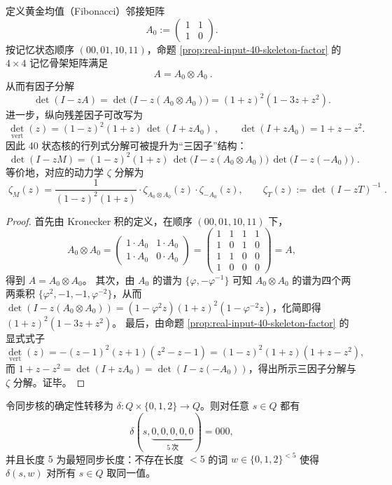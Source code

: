 \begin{proposition}\label{prop:real-input-40-A0-tensor-hidden}
定义黄金均值（Fibonacci）邻接矩阵
\[
A_0:=\begin{pmatrix}1&1\\[2pt]1&0\end{pmatrix}.
\]
按记忆状态顺序 \((00,01,10,11)\)，命题 \ref{prop:real-input-40-skeleton-factor} 的 \(4\times 4\) 记忆骨架矩阵满足
\[
\boxed{\ A=A_0\otimes A_0\ }.
\]
从而有因子分解
\[
\det(I-zA)=\det\!\bigl(I-z(A_0\otimes A_0)\bigr)
=(1+z)^2(1-3z+z^2).
\]
进一步，纵向残差因子可改写为
\[
\boxed{\ \det_{\mathrm{vert}}(z)=(1-z)^2(1+z)\,\det(I+zA_0)\ },
\qquad
\det(I+zA_0)=1+z-z^2.
\]
因此 40 状态核的行列式分解可被提升为“三因子”结构：
\[
\boxed{\;
\det(I-zM)
=(1-z)^2(1+z)\,
\det\!\bigl(I-z(A_0\otimes A_0)\bigr)\,
\det\!\bigl(I-z(-A_0)\bigr)\; }.
\]
等价地，对应的动力学 \(\zeta\) 分解为
\[
\boxed{\;
\zeta_M(z)=\frac{1}{(1-z)^2(1+z)}\cdot
\zeta_{A_0\otimes A_0}(z)\cdot
\zeta_{-A_0}(z),\qquad
\zeta_T(z):=\det(I-zT)^{-1}\; }.
\]
\end{proposition}

\begin{proof}
首先由 Kronecker 积的定义，在顺序 \((00,01,10,11)\) 下，
\[
A_0\otimes A_0=
\begin{pmatrix}
1\cdot A_0 & 1\cdot A_0\\
1\cdot A_0 & 0\cdot A_0
\end{pmatrix}
=
\begin{pmatrix}
1&1&1&1\\
1&0&1&0\\
1&1&0&0\\
1&0&0&0
\end{pmatrix}=A,
\]
得到 \(A=A_0\otimes A_0\)。
其次，由 \(A_0\) 的谱为 \(\{\varphi,-\varphi^{-1}\}\) 可知 \(A_0\otimes A_0\) 的谱为四个两两乘积
\(\{\varphi^2,-1,-1,\varphi^{-2}\}\)，从而
\(\det(I-z(A_0\otimes A_0))=(1-\varphi^2 z)(1+\!z)^2(1-\varphi^{-2}z)\)，化简即得 \((1+z)^2(1-3z+z^2)\)。
最后，由命题 \ref{prop:real-input-40-skeleton-factor} 的显式式子
\[
\det_{\mathrm{vert}}(z)=-(z-1)^2(z+1)(z^2-z-1)
=(1-z)^2(1+z)(1+z-z^2),
\]
而 \(1+z-z^2=\det(I+zA_0)=\det(I-z(-A_0))\)，得出所示三因子分解与 \(\zeta\) 分解。证毕。
\end{proof}

\begin{proposition}\label{prop:real-input-40-reset-word}
令同步核的确定性转移为 $\delta:Q\times\{0,1,2\}\to Q$。则对任意 $s\in Q$ 都有
\[
\delta(s,\underbrace{0,0,0,0,0}_{5\ \text{次}})=000,
\]
并且长度 $5$ 为最短同步长度：不存在长度 $<5$ 的词 $w\in\{0,1,2\}^{<5}$ 使得 $\delta(s,w)$ 对所有 $s\in Q$ 取同一值。
\end{proposition}

